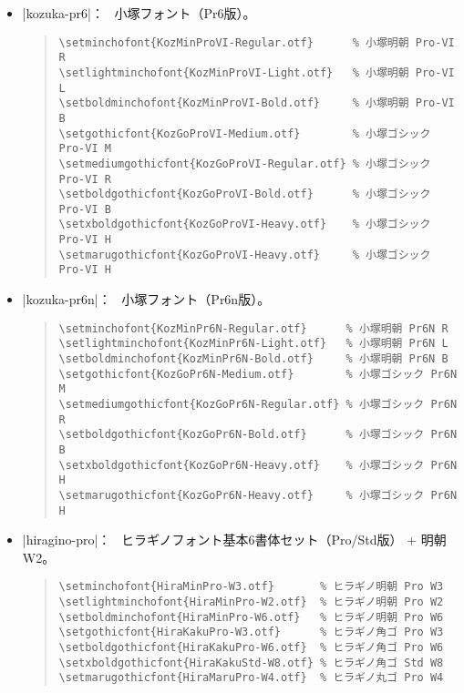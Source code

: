 \documentclass[a4paper,uplatex]{jsarticle}
\newcommand{\Means}{：\ }
\begin{document}
\begin{itemize}
\item |kozuka-pr6|\Means
  小塚フォント（Pr6版）。
\begin{quote}\small\begin{verbatim}
\setminchofont{KozMinProVI-Regular.otf}      % 小塚明朝 Pro-VI R
\setlightminchofont{KozMinProVI-Light.otf}   % 小塚明朝 Pro-VI L
\setboldminchofont{KozMinProVI-Bold.otf}     % 小塚明朝 Pro-VI B
\setgothicfont{KozGoProVI-Medium.otf}        % 小塚ゴシック Pro-VI M
\setmediumgothicfont{KozGoProVI-Regular.otf} % 小塚ゴシック Pro-VI R
\setboldgothicfont{KozGoProVI-Bold.otf}      % 小塚ゴシック Pro-VI B
\setxboldgothicfont{KozGoProVI-Heavy.otf}    % 小塚ゴシック Pro-VI H
\setmarugothicfont{KozGoProVI-Heavy.otf}     % 小塚ゴシック Pro-VI H
\end{verbatim}\end{quote}

\item |kozuka-pr6n|\Means
  小塚フォント（Pr6n版）。
\begin{quote}\small\begin{verbatim}
\setminchofont{KozMinPr6N-Regular.otf}      % 小塚明朝 Pr6N R
\setlightminchofont{KozMinPr6N-Light.otf}   % 小塚明朝 Pr6N L
\setboldminchofont{KozMinPr6N-Bold.otf}     % 小塚明朝 Pr6N B
\setgothicfont{KozGoPr6N-Medium.otf}        % 小塚ゴシック Pr6N M
\setmediumgothicfont{KozGoPr6N-Regular.otf} % 小塚ゴシック Pr6N R
\setboldgothicfont{KozGoPr6N-Bold.otf}      % 小塚ゴシック Pr6N B
\setxboldgothicfont{KozGoPr6N-Heavy.otf}    % 小塚ゴシック Pr6N H
\setmarugothicfont{KozGoPr6N-Heavy.otf}     % 小塚ゴシック Pr6N H
\end{verbatim}\end{quote}

\item |hiragino-pro|\Means
  ヒラギノフォント基本6書体セット（Pro/Std版） + 明朝W2。
\begin{quote}\small\begin{verbatim}
\setminchofont{HiraMinPro-W3.otf}       % ヒラギノ明朝 Pro W3
\setlightminchofont{HiraMinPro-W2.otf}  % ヒラギノ明朝 Pro W2
\setboldminchofont{HiraMinPro-W6.otf}   % ヒラギノ明朝 Pro W6
\setgothicfont{HiraKakuPro-W3.otf}      % ヒラギノ角ゴ Pro W3
\setboldgothicfont{HiraKakuPro-W6.otf}  % ヒラギノ角ゴ Pro W6
\setxboldgothicfont{HiraKakuStd-W8.otf} % ヒラギノ角ゴ Std W8
\setmarugothicfont{HiraMaruPro-W4.otf}  % ヒラギノ丸ゴ Pro W4
\end{verbatim}\end{quote}


\end{itemize}
\end{document}
